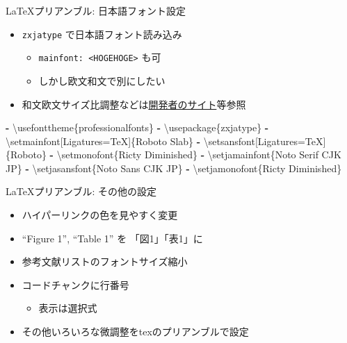 \documentclass[
  12pt,
  ignorenonframetext,
]{beamer}
\newenvironment{Shaded}{\begin{snugshade}}{\end{snugshade}}
\newcommand{\AttributeTok}[1]{\textcolor[rgb]{0.77,0.63,0.00}{#1}}
\newcommand{\KeywordTok}[1]{\textcolor[rgb]{0.13,0.29,0.53}{\textbf{#1}}}
\providecommand{\tightlist}{%
  \setlength{\itemsep}{0pt}\setlength{\parskip}{0pt}}
\begin{document}
\begin{frame}[fragile]{\LaTeX プリアンブル: 日本語フォント設定}
\protect\hypertarget{ux30d7ux30eaux30a2ux30f3ux30d6ux30eb-ux65e5ux672cux8a9eux30d5ux30a9ux30f3ux30c8ux8a2dux5b9a}{}

\begin{itemize}
\tightlist
\item
  \texttt{zxjatype} で日本語フォント読み込み

  \begin{itemize}
  \tightlist
  \item
    \texttt{mainfont:\ \textless{}HOGEHOGE\textgreater{}} も可
  \item
    しかし欧文和文で別にしたい
  \end{itemize}
\item
  和文欧文サイズ比調整などは\href{http://zrbabbler.sp.land.to/zxjatype.html}{開発者のサイト}等参照
\end{itemize}

\begin{Shaded}
\begin{Highlighting}[]
\KeywordTok{-}\AttributeTok{ \textbackslash{}usefonttheme\{professionalfonts\}}
\KeywordTok{-}\AttributeTok{ \textbackslash{}usepackage\{zxjatype\}}
\KeywordTok{-}\AttributeTok{ \textbackslash{}setmainfont[Ligatures=TeX]\{Roboto Slab\}}
\KeywordTok{-}\AttributeTok{ \textbackslash{}setsansfont[Ligatures=TeX]\{Roboto\}}
\KeywordTok{-}\AttributeTok{ \textbackslash{}setmonofont\{Ricty Diminished\}}
\KeywordTok{-}\AttributeTok{ \textbackslash{}setjamainfont\{Noto Serif CJK JP\}}
\KeywordTok{-}\AttributeTok{ \textbackslash{}setjasansfont\{Noto Sans CJK JP\}}
\KeywordTok{-}\AttributeTok{ \textbackslash{}setjamonofont\{Ricty Diminished\}}
\end{Highlighting}
\end{Shaded}

\end{frame}

\begin{frame}{\LaTeX プリアンブル: その他の設定}
\protect\hypertarget{ux30d7ux30eaux30a2ux30f3ux30d6ux30eb-ux305dux306eux4ed6ux306eux8a2dux5b9a}{}

\begin{itemize}
\tightlist
\item
  ハイパーリンクの色を見やすく変更
\item
  ``Figure 1'', ``Table 1'' を 「図1」「表1」に
\item
  参考文献リストのフォントサイズ縮小
\item
  コードチャンクに行番号

  \begin{itemize}
  \tightlist
  \item
    表示は選択式
  \end{itemize}
\item
  その他いろいろな微調整をtexのプリアンブルで設定
\end{itemize}

\end{frame}
\end{document}
